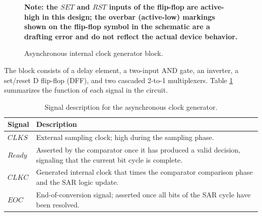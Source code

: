 \begin{figure}[h]
{
	
}
	\caption{Asynchronous internal clock generator block.}
	 \textbf{Note:
		the $SET$ and $RST$ inputs of the flip-flop are active-high in this
		design; the overbar (active-low) markings shown on the flip-flop
		symbol in the schematic are a drafting error and do not reflect the
		actual device behavior.}
	\label{fig:async_clk_gen}
\end{figure}

The block consists of a delay element, a two-input AND gate, an inverter,
a set/reset D flip-flop (DFF), and two cascaded 2-to-1 multiplexers. Table
\ref{tab:async_clk_signals} summarizes the function of each signal in the
circuit.

\begin{table}[h]
	\centering
	\caption{Signal description for the asynchronous clock generator.}
	\label{tab:async_clk_signals}
	\begin{tabular}{@{}p{2.2cm}p{10.5cm}@{}}
		\toprule
		Signal & Description \\
		\midrule
		$CLKS$ & External sampling clock; high during the sampling phase. \\
		$Ready$ & Asserted by the comparator once it has produced a valid
		decision, signaling that the current bit cycle is complete. \\
		$CLKC$ & Generated internal clock that times the comparator
		comparison phase and the SAR logic update. \\
		$EOC$ & End-of-conversion signal; asserted once all bits of the
		SAR cycle have been resolved. \\
		\bottomrule
	\end{tabular}
\end{table}

